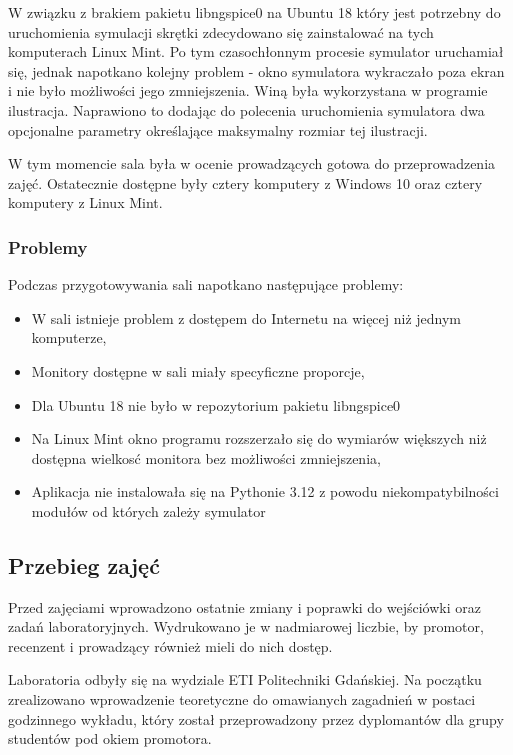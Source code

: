 W związku z brakiem pakietu libngspice0 na Ubuntu 18 który jest potrzebny do uruchomienia symulacji skrętki zdecydowano się zainstalować na tych komputerach Linux Mint. Po tym czasochłonnym procesie symulator uruchamiał się, jednak napotkano kolejny problem - okno symulatora wykraczało poza ekran i nie było możliwości jego zmniejszenia. Winą była wykorzystana w programie ilustracja. Naprawiono to dodając do polecenia uruchomienia symulatora dwa opcjonalne parametry określające maksymalny
rozmiar tej ilustracji.

W tym momencie sala była w ocenie prowadzących gotowa do przeprowadzenia zajęć. Ostatecznie dostępne były cztery komputery z Windows 10 oraz cztery komputery z Linux Mint.

\subsubsection{Problemy}
Podczas przygotowywania sali napotkano następujące problemy:
\begin{itemize}
    \item W sali istnieje problem z dostępem do Internetu na więcej niż jednym komputerze,
    \item Monitory dostępne w sali miały specyficzne proporcje,
    \item Dla Ubuntu 18 nie było w repozytorium pakietu libngspice0
    \item Na Linux Mint okno programu rozszerzało się do wymiarów większych niż dostępna wielkosć monitora bez możliwości zmniejszenia,
    \item Aplikacja nie instalowała się na Pythonie 3.12 z powodu niekompatybilności
    modułów od których zależy symulator
\end{itemize}

\subsection{Przebieg zajęć}

Przed zajęciami wprowadzono ostatnie zmiany i poprawki do wejściówki oraz zadań laboratoryjnych. Wydrukowano je w nadmiarowej liczbie, by promotor, recenzent i prowadzący również mieli do nich dostęp.

Laboratoria odbyły się na wydziale ETI Politechniki Gdańskiej. Na początku zrealizowano wprowadzenie teoretyczne do omawianych zagadnień w postaci godzinnego
wykładu, który został przeprowadzony przez dyplomantów dla grupy studentów pod okiem promotora.

